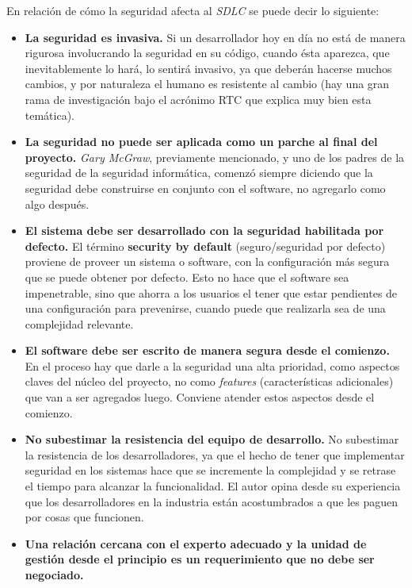 En relación de cómo la seguridad afecta al \textit{SDLC} se puede decir lo siguiente\cite{GaryMcGrawSoftwareSecurity}\cite{TheSDLCMicrosoft}\cite{SoftwarePenetrationTesting}\cite{Manicode:SSDLC}:
\begin{itemize}
\item \textbf{La seguridad es invasiva.} \newline Si un desarrollador hoy en día no está de manera rigurosa involucrando la seguridad en su código, cuando ésta aparezca, que inevitablemente lo hará, lo sentirá invasivo, ya que deberán hacerse muchos cambios, y por naturaleza el humano es resistente al cambio (hay una gran rama de investigación bajo el acrónimo RTC que explica muy bien esta temática).
\item \textbf{La seguridad no puede ser aplicada como un parche al final del proyecto.} \newline \textit{Gary McGraw}, previamente mencionado, y uno de los padres de la seguridad de la seguridad informática, comenzó siempre diciendo que la seguridad debe construirse en conjunto con el software, no agregarlo como algo después.
\item \textbf{El sistema debe ser desarrollado con la seguridad habilitada por defecto.} \newline El término \textbf{security by default} (seguro/seguridad por defecto) proviene de proveer un sistema o software, con la configuración más segura que se puede obtener por defecto. Esto no hace que el software sea impenetrable, sino que ahorra a los usuarios el tener que estar pendientes de una configuración para prevenirse, cuando puede que realizarla sea de una complejidad relevante.
\item \textbf{El software debe ser escrito de manera segura desde el comienzo.} \newline En el proceso hay que darle a la seguridad una alta prioridad, como aspectos claves del núcleo del proyecto, no como \textit{features} (características adicionales) que van a ser agregados luego. Conviene atender estos aspectos desde el comienzo. 
\item \textbf{No subestimar la resistencia del equipo de desarrollo.} \newline No subestimar la resistencia de los desarrolladores, ya que el hecho de tener que implementar seguridad en los sistemas hace que se incremente la complejidad y se retrase el tiempo para alcanzar la funcionalidad. El autor opina desde su experiencia que los desarrolladores en la industria están acostumbrados a que les paguen por cosas que funcionen.
\item \textbf{Una relación cercana con el experto adecuado y la unidad de gestión desde el principio es un requerimiento que no debe ser negociado.}
\end{itemize}
\bigskip

